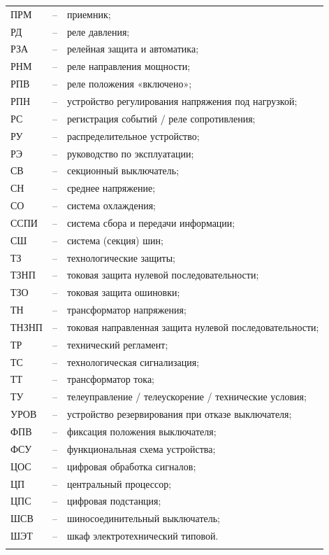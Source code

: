 \begin{longtable}{>{\raggedright\arraybackslash}m{2cm}>{\raggedright\arraybackslash}m{0.5cm}>{\raggedright\arraybackslash}m{20cm}}
ПРМ & -- & приемник; \\
РД & -- & реле давления; \\
РЗА & -- & релейная защита и автоматика; \\
РНМ & -- & реле направления мощности; \\
РПВ & -- & реле положения «включено»; \\
РПН & -- & устройство регулирования напряжения под нагрузкой; \\
РС & -- & регистрация событий / реле сопротивления; \\
РУ & -- & распределительное устройство; \\
РЭ & -- & руководство по эксплуатации; \\
СВ & -- & секционный выключатель; \\
СН & -- & среднее напряжение; \\
СО & -- & система охлаждения; \\
ССПИ & -- & система сбора и передачи информации; \\
СШ & -- & система (секция) шин; \\
ТЗ & -- & технологические защиты; \\
ТЗНП & -- & токовая защита нулевой последовательности; \\
ТЗО & -- & токовая защита ошиновки; \\
ТН & -- & трансформатор напряжения; \\
ТНЗНП & -- & токовая направленная защита нулевой последовательности; \\
ТР & -- & технический регламент; \\
ТС & -- & технологическая сигнализация; \\
ТТ & -- & трансформатор тока; \\
ТУ & -- & телеуправление / телеускорение / технические условия; \\
УРОВ & -- & устройство резервирования при отказе выключателя; \\
ФПВ & -- & фиксация положения выключателя; \\
ФСУ & -- & функциональная схема устройства; \\
ЦОС & -- & цифровая обработка сигналов; \\
ЦП & -- & центральный процессор; \\
ЦПС & -- & цифровая подстанция; \\
ШСВ & -- & шиносоединительный выключатель; \\
ШЭТ & -- & шкаф электротехнический типовой. \\
{\color{white}\fontsize{0.1pt}{0.1pt}\selectfont<endABBRS>}
\end{longtable}
